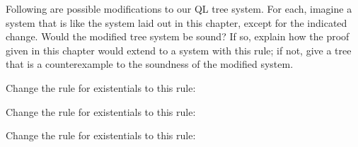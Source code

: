 ﻿%



\solutions
\problempart
\label{pr.QLalttrees-sound}
Following are possible modifications to our QL tree system. For each, imagine a system that is like the system laid out in this chapter, except for the indicated change. Would the modified tree system be sound? If so, explain how the proof given in this chapter would extend to a system with this rule; if not, give a tree that is a counterexample to the soundness of the modified system.
\begin{earg}
\item Change the rule for existentials to this rule:
	
\item Change the rule for existentials to this rule:

\item Change the rule for existentials to this rule:


\end{earg}
